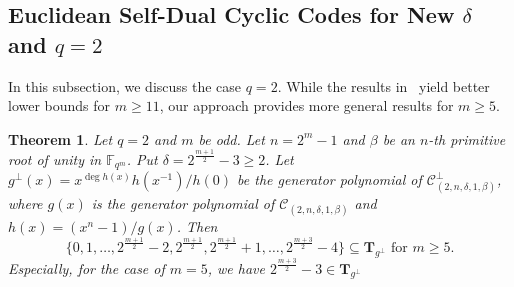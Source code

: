 \documentclass[journal,12pt,onecolumn]{IEEEtran}
\newtheorem{theorem}{Theorem}
\begin{document}
\subsection{Euclidean Self-Dual Cyclic Codes for New $\delta$ and $q=2$}

In this subsection, we discuss the case $q = 2$. While the results in~\cite{wang2026constructionsselfdualbinarycyclic} yield better lower bounds for $m \ge 11$, our approach provides more general results for $m \ge 5$.
\begin{theorem}
    \label{2 small delta}
    Let $q=2$ and $m$ be odd. Let $n=2^m-1$ and $\beta$ be an $n$-th primitive root of unity in $\mathbb{F}_{q^m}$. Put $\delta=2^{\frac{m+1}{2}}-3\ge2$. Let $g^\perp(x)=x^{\deg h(x)}h(x^{-1})/h(0)$ be the generator polynomial of $\mathcal{C}_{(2,n,\delta,1,\beta)}^\perp$, where $g(x)$ is the generator polynomial of $\mathcal{C}_{(2,n,\delta,1,\beta)}$ and $h(x)=(x^n-1)/g(x)$. Then \[\{0,1,\dots,2^\frac{m+1}{2}-2,2^\frac{m+1}{2},2^\frac{m+1}{2}+1,\dots,2^\frac{m+3}{2}-4\}\subseteq \textbf{T}_{g^\perp} \text{~for~} m\ge 5.\]
    Especially, for the case of $m=5$, we have $2^\frac{m+3}{2}-3\in \textbf{T}_{g^\perp}$
\end{theorem}
\end{document}

